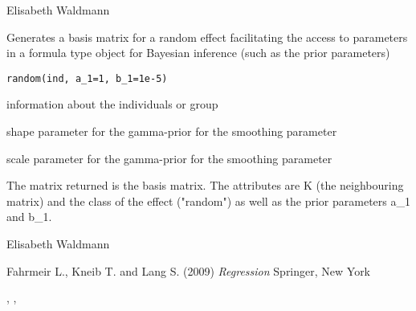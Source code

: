 \documentclass[a4paper]{book}
\begin{document}
%
\begin{Author}\relax
Elisabeth Waldmann
\end{Author}
%
\begin{Description}\relax

Generates a basis matrix for a random effect facilitating the access to parameters in a formula type object
for Bayesian inference (such as the prior parameters)
\end{Description}
%
\begin{Usage}
\begin{verbatim}
random(ind, a_1=1, b_1=1e-5)
\end{verbatim}
\end{Usage}
%
\begin{Arguments}
\begin{ldescription}
\item[\code{ind}] 
information about the individuals or group
\item[\code{a\_1}] 
shape parameter for the gamma-prior for the smoothing parameter
\item[\code{b\_1}] 
scale parameter for the gamma-prior for the smoothing parameter

\end{ldescription}
\end{Arguments}
%
\begin{Value}


The matrix returned is the basis matrix. The attributes are
K (the neighbouring matrix) and the class of the effect ("random") as well as the prior parameters a\_1 and b\_1.

\end{Value}
%
\begin{Author}\relax
Elisabeth Waldmann


\end{Author}
%
\begin{References}\relax

Fahrmeir L., Kneib T. and Lang S. (2009) \emph{Regression} Springer, New York
\end{References}
%
\begin{SeeAlso}\relax
{}, , 
\end{SeeAlso}
\end{document}
